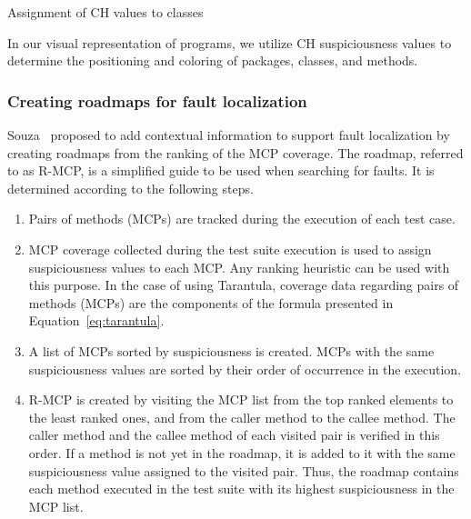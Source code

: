 \begin{algorithm}
\BlankLine

{
  {
  }
}
\;
\caption{Assignment of CH values to classes}
\label{alg-CH}
\end{algorithm}

In our visual representation of programs, we utilize CH suspiciousness values
to determine the positioning and coloring of packages, classes, and methods.

\subsubsection{Creating roadmaps for fault localization}

Souza~\cite{souza2012depuracao} proposed  to add contextual information to
support fault localization by creating roadmaps from the ranking of the MCP
coverage.  The roadmap, referred to as R-MCP, is a simplified guide to be used
when searching for faults. It is determined according to the following steps.
\begin{enumerate}
\item Pairs of methods (MCPs) are tracked during the execution of each test case.
\item MCP coverage collected during the test suite execution is used to assign
suspiciousness values to each MCP.  Any ranking heuristic can be used with this purpose. In the case of using Tarantula,  coverage data regarding pairs of methods (MCPs) are  the components  of the  formula presented in Equation~\ref{eq:tarantula}. %
\item A list of MCPs sorted by suspiciousness is created. MCPs with the same suspiciousness values are sorted by their  order of occurrence in the execution.
\item R-MCP is created by visiting  the MCP list from the top ranked elements to the least ranked ones, and from the caller method to the callee method. The caller method  and the callee method of each visited pair  is verified in this order. If a method is not yet in the roadmap, it is  added to it with the same suspiciousness value assigned to the visited pair. Thus, the roadmap contains each method executed in the test suite with its highest suspiciousness in the MCP  list.

\end{enumerate}

